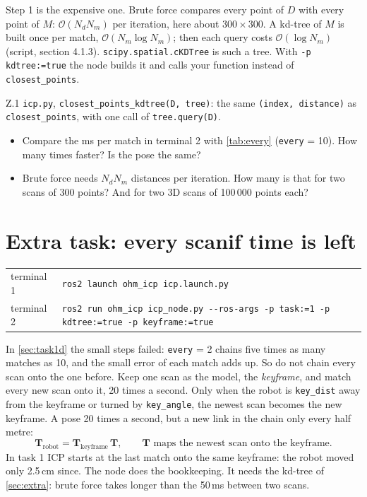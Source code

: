 \documentclass[11pt,a4paper,parskip=half]{scrartcl}
\makeatletter
\newcommand{\thema}[1]{\texttt{#1}}
\newcommand{\datei}[1]{\texttt{#1}}
\newcommand{\matsym}[1]{\mathbf{#1}}
\newcommand{\running}[2]{\begin{tcolorbox}[base, colback=black!3, borderline west={2.5pt}{0pt}{ohmgrey},
        title={\faTerminal~Running}, coltitle=ohmgrey, colbacktitle=black!3, fonttitle=\small\bfseries,
        toptitle=2pt, bottomtitle=0pt, fontupper=\small]
  \begin{tabularx}{\linewidth}{@{}>{\color{ohmgrey}}l >{\raggedright\arraybackslash}X@{}}
    terminal 1 & \texttt{ros2 launch ohm\_icp icp.launch.py#1} \\
    terminal 2 & \texttt{ros2 run ohm\_icp icp\_node.py -\kern0pt-ros-args #2}
  \end{tabularx}
\end{tcolorbox}}
\makeatother
\begin{document}
Step 1 is the expensive one. Brute force compares every point of \(D\) with every point of \(M\):
\(\mathcal O(N_d N_m)\) per iteration, here about \(300 \times 300\). A kd-tree of \(M\) is built once per match,
\(\mathcal O(N_m \log N_m)\); then each query costs \(\mathcal O(\log N_m)\) (script, section 4.1.3).
\thema{scipy.spatial.cKDTree} is such a tree. With \thema{-p kdtree:=true} the node builds it and calls your
function instead of \thema{closest\_points}.

\begin{todo}{Z.1}
\datei{icp.py}, \thema{closest\_points\_kdtree(D, tree)}: the same \thema{(index, distance)} as
\thema{closest\_points}, with one call of \thema{tree.query(D)}.
\end{todo}

\begin{itemize}
  \item Compare the ms per match in terminal 2 with \cref{tab:every} (\thema{every} = 10). How many times
        faster? Is the pose the same?
  \item Brute force needs \(N_d N_m\) distances per iteration. How many is that for two scans of 300 points?
        And for two 3D scans of 100\,000 points each?
\end{itemize}

\newpage
\section{Extra task: every scan\hfill{\normalsize\mdseries\color{ohmgrey}if time is left}}
\label{sec:extra2}
\running{}{-p task:=1 -p kdtree:=true -p keyframe:=true}

In \cref{sec:task1d} the small steps failed: \thema{every} = 2 chains five times as many matches as 10, and the
small error of each match adds up. So do not chain every scan onto the one before. Keep one scan as the model,
the \emph{keyframe}, and match every new scan onto it, 20 times a second. Only when the robot is
\thema{key\_dist} away from the keyframe or turned by \thema{key\_angle}, the newest scan becomes the new
keyframe. A pose 20 times a second, but a new link in the chain only every half metre:
\begin{equation*}
  \matsym T_\text{robot} = \matsym T_\text{keyframe} \, \matsym T , \qquad
  \matsym T \text{ maps the newest scan onto the keyframe.}
\end{equation*}
In task 1 ICP starts at the last match onto the same keyframe: the robot moved only 2.5\,cm since. The node
does the bookkeeping. It needs the kd-tree of \cref{sec:extra}: brute force takes longer than the 50\,ms
between two scans.
\end{document}
